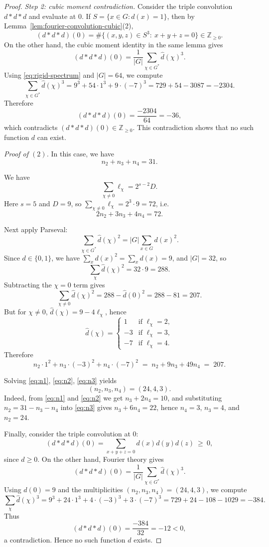\documentclass[12pt,twoside,]{amsart}
\theoremstyle{plain}
\theoremstyle{definition}
\begin{document}
\begin{proof}
\medskip\noindent
\emph{Step 2: cubic moment contradiction.}
Consider the triple convolution $d*d*d$ and evaluate at $0$.
If $S=\{x\in G:d(x)=1\}$, then by
Lemma~\ref{lem:fourier-convolution-cubic}(2),
\[
(d*d*d)(0)=\#\{(x,y,z)\in S^3:\ x+y+z=0\}\in\mathbb Z_{\ge 0}.
\]
On the other hand, the cubic moment identity in the same lemma gives
\[
(d*d*d)(0)=\frac{1}{|G|}\sum_{\chi\in G^*}\widehat d(\chi)^3.
\]
Using \eqref{eq:rigid-spectrum} and $|G|=64$, we compute
\[
\sum_{\chi\in G^*}\widehat d(\chi)^3
=
9^3+54\cdot 1^3+9\cdot(-7)^3
=
729+54-3087=-2304.
\]
Therefore
\[
(d*d*d)(0)=\frac{-2304}{64}=-36,
\]
which contradicts $(d*d*d)(0)\in\mathbb Z_{\ge 0}$. This contradiction shows that no such
function $d$ can exist.  

\noindent\textit{Proof of $(2)$.} In this case, we have
\begin{equation}\label{eq:n1}
n_2+n_3+n_4=31.
\end{equation}

We have
\[
\sum_{\chi\neq 0}\ell_\chi = 2^{s-2}D.
\]
Here $s=5$ and $D=9$, so $\sum_{\chi\neq 0}\ell_\chi=2^{3}\cdot 9=72$, i.e.
\begin{equation}\label{eq:n2}
2n_2+3n_3+4n_4=72.
\end{equation}

Next apply Parseval:
\[
\sum_{\chi\in G^*}\widehat d(\chi)^2
=|G|\sum_{x\in G} d(x)^2.
\]
Since $d\in\{0,1\}$, we have $\sum_x d(x)^2=\sum_x d(x)=9$, and $|G|=32$, so
\[
\sum_{\chi}\widehat d(\chi)^2 = 32\cdot 9=288.
\]
Subtracting the $\chi=0$ term gives
\[
\sum_{\chi\neq 0}\widehat d(\chi)^2
=288-\widehat d(0)^2
=288-81
=207.
\]
But for $\chi\neq 0$, $\widehat d(\chi)=9-4\ell_\chi$, hence
\[
\widehat d(\chi)=
\begin{cases}
1 & \text{if }\ell_\chi=2,\\
-3 & \text{if }\ell_\chi=3,\\
-7 & \text{if }\ell_\chi=4.
\end{cases}
\]
Therefore
\begin{equation}\label{eq:n3}
n_2\cdot 1^2 + n_3\cdot (-3)^2 + n_4\cdot (-7)^2
\;=\;
n_2+9n_3+49n_4
\;=\; 207.
\end{equation}

Solving \eqref{eq:n1}, \eqref{eq:n2}, \eqref{eq:n3} yields
\[
(n_2,n_3,n_4)=(24,4,3).
\]
Indeed, from \eqref{eq:n1} and \eqref{eq:n2} we get $n_3+2n_4=10$, and substituting
$n_2=31-n_3-n_4$ into \eqref{eq:n3} gives $n_3+6n_4=22$, hence $n_4=3$,
$n_3=4$, and $n_2=24$.

Finally, consider the triple convolution at $0$:
\[
(d*d*d)(0)=\sum_{x+y+z=0} d(x)d(y)d(z)\ \ge\ 0,
\]
since $d\ge 0$. On the other hand, Fourier theory gives
\[
(d*d*d)(0)=\frac{1}{|G|}\sum_{\chi\in G^*}\widehat d(\chi)^3.
\]
Using $\widehat d(0)=9$ and the multiplicities $(n_2,n_3,n_4)=(24,4,3)$, we compute
\[
\sum_{\chi}\widehat d(\chi)^3
=9^3 + 24\cdot 1^3 + 4\cdot(-3)^3 + 3\cdot(-7)^3
=729+24-108-1029=-384.
\]
Thus
\[
(d*d*d)(0)=\frac{-384}{32}=-12<0,
\]
a contradiction. Hence no such function $d$ exists.


\end{proof}
\end{document}
